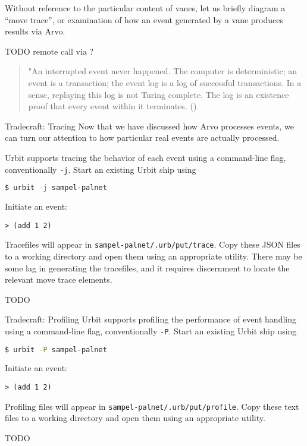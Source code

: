 Without reference to the particular content of vanes, let us briefly diagram a “move trace”, or examination of how an event generated by a vane produces results via Arvo.

TODO remote call via \ames?

\begin{quote}
"An interrupted event never happened.  The computer is deterministic; an event is a transaction; the event log is a log of successful transactions. In a sense, replaying this log is not Turing complete. The log is an existence proof that every event within it terminates.  (\cite{Yarvin2017})
\end{quote}

\begin{example}{Tradecraft:  Tracing}
Now that we have discussed how Arvo processes events, we can turn our attention to how particular real events are actually processed.

Urbit supports tracing the behavior of each event using a command-line flag, conventionally \texttt{-j}.  Start an existing Urbit ship using

\begin{lstlisting}[language=bash,
                   style=nonumbers]
$ urbit -j sampel-palnet
\end{lstlisting}

Initiate an event:

\begin{lstlisting}[language=hoon,
                   style=nonumbers]
> (add 1 2)
\end{lstlisting}

Tracefiles will appear in \texttt{sampel-palnet/.urb/put/trace}.  Copy these JSON files to a working directory and open them using an appropriate utility.  There may be some lag in generating the tracefiles, and it requires discernment to locate the relevant move trace elements.

TODO
\end{example}

\begin{example}{Tradecraft:  Profiling}
  Urbit supports profiling the performance of event handling using a command-line flag, conventionally \texttt{-P}.  Start an existing Urbit ship using

  \begin{lstlisting}[language=bash,
                     style=nonumbers]
  $ urbit -P sampel-palnet
  \end{lstlisting}

  Initiate an event:

  \begin{lstlisting}[language=hoon,
                     style=nonumbers]
  > (add 1 2)
  \end{lstlisting}

  Profiling files will appear in \texttt{sampel-palnet/.urb/put/profile}.  Copy these text files to a working directory and open them using an appropriate utility.

TODO
\end{example}

